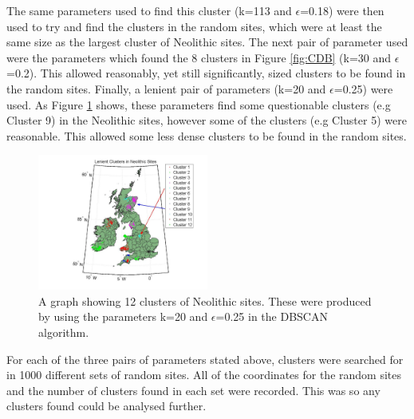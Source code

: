 \documentclass[a4paper]{article}
\begin{document}
The same parameters used to find this cluster (k=113 and $\epsilon$=0.18) were then used to try and find the clusters in the random sites, which were at least the same size as the largest cluster of Neolithic sites. The next pair of parameter used were the parameters which found the 8 clusters in Figure \ref{fig:CDB} (k=30 and $\epsilon$=0.2). This allowed reasonably, yet still significantly, sized clusters to be found in the random sites. Finally, a lenient pair of parameters (k=20 and $\epsilon$=0.25) were used. As Figure \ref{fig:LCNS} shows, these parameters find some questionable clusters (e.g Cluster 9) in the Neolithic sites, however some of the clusters (e.g Cluster 5) were reasonable. This allowed some less dense clusters to be found in the random sites. 

\begin{figure}[H]
\centering
\includegraphics[width=0.5\textwidth]{LCNSv2.jpg}
\caption{\label{fig:LCNS}A graph showing 12 clusters of Neolithic sites. These were produced by using the parameters k=20 and $\epsilon$=0.25 in the DBSCAN algorithm.}
\end{figure}

For each of the three pairs of parameters stated above, clusters were searched for in 1000 different sets of random sites. All of the coordinates for the random sites and the number of clusters found in each set were recorded. This was so any clusters found could be analysed further.
\end{document}
